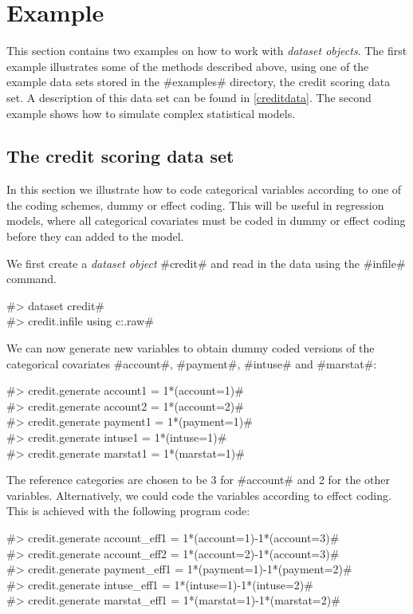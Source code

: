 \section{Example}

This section contains two examples on how to work with {\em
dataset objects}. The first example illustrates some of the
methods described above, using one of the example data sets stored
in the #examples# directory, the credit scoring data set. A
description of this data set can be found in \autoref{creditdata}.
The second example shows how to simulate complex statistical
models.

\subsection{The credit scoring data set}

In this section we illustrate how to code categorical variables
according to one of the coding schemes, dummy or effect coding.
This will be useful in regression models, where all categorical
covariates must be coded in dummy or effect coding before they can
added to the model.

We first create a {\em dataset object} #credit# and read in the data using the #infile# command.

#> dataset credit# \\
#> credit.infile using c:\bayes\examples\credit.raw#

We can now generate new variables to obtain dummy coded versions
of the categorical covariates
#account#, #payment#, #intuse# and #marstat#:

#> credit.generate account1  = 1*(account=1)# \\
#> credit.generate account2  = 1*(account=2)# \\
#> credit.generate payment1 = 1*(payment=1)# \\
#> credit.generate intuse1 = 1*(intuse=1)# \\
#> credit.generate marstat1 = 1*(marstat=1)#

The reference categories are chosen to be 3 for #account# and 2
for the other variables. Alternatively, we could code the
variables according to effect coding. This is achieved with the
following program code:

#> credit.generate account_eff1  = 1*(account=1)-1*(account=3)# \\
#> credit.generate account_eff2  = 1*(account=2)-1*(account=3)# \\
#> credit.generate payment_eff1 = 1*(payment=1)-1*(payment=2)# \\
#> credit.generate intuse_eff1 = 1*(intuse=1)-1*(intuse=2)# \\
#> credit.generate marstat_eff1 = 1*(marstat=1)-1*(marstat=2)#


